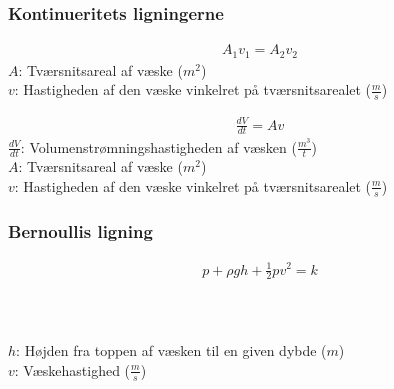 	\subsubsection{Kontinueritets ligningerne}
		\begin{align}
			A_1v_1=A_2v_2
		\end{align}
		$A$: Tværsnitsareal af væske ($m^2$)\\
		$v$: Hastigheden af den væske vinkelret på tværsnitsarealet ($\frac{m}{s}$)

		\begin{align}
			\frac{dV}{dt}=Av
		\end{align}
		$\frac{dV}{dt}$: Volumenstrømningshastigheden af væsken ($\frac{m^3}{t}$)\\
		$A$: Tværsnitsareal af væske ($m^2$)\\
		$v$: Hastigheden af den væske vinkelret på tværsnitsarealet ($\frac{m}{s}$)

	\subsubsection{Bernoullis ligning}
		\begin{align}
			p+\rho gh+\frac{1}{2}pv^2=k
		\end{align}
		\tryk\\
		\densitet\\
		\tyngde\\
		$h$: Højden fra toppen af væsken til en given dybde ($m$)\\
		$v$: Væskehastighed ($\frac{m}{s}$)